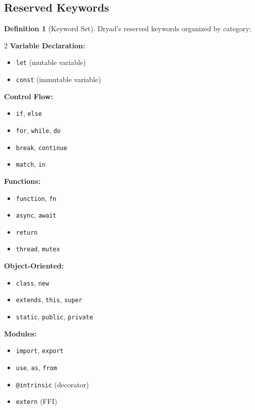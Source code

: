 \documentclass[12pt,a4paper]{article}
\theoremstyle{definition}
\newtheorem{definition}{Definition}[section]
\begin{document}
\subsection{Reserved Keywords}

\begin{definition}[Keyword Set]
Dryad's reserved keywords organized by category:

\begin{multicols}{2}
\textbf{Variable Declaration:}
\begin{itemize}[noitemsep]
    \item \texttt{let} (mutable variable)
    \item \texttt{const} (immutable variable)
\end{itemize}

\textbf{Control Flow:}
\begin{itemize}[noitemsep]
    \item \texttt{if}, \texttt{else}
    \item \texttt{for}, \texttt{while}, \texttt{do}
    \item \texttt{break}, \texttt{continue}
    \item \texttt{match}, \texttt{in}
\end{itemize}

\textbf{Functions:}
\begin{itemize}[noitemsep]
    \item \texttt{function}, \texttt{fn}
    \item \texttt{async}, \texttt{await}
    \item \texttt{return}
    \item \texttt{thread}, \texttt{mutex}
\end{itemize}

\textbf{Object-Oriented:}
\begin{itemize}[noitemsep]
    \item \texttt{class}, \texttt{new}
    \item \texttt{extends}, \texttt{this}, \texttt{super}
    \item \texttt{static}, \texttt{public}, \texttt{private}
\end{itemize}

\textbf{Modules:}
\begin{itemize}[noitemsep]
    \item \texttt{import}, \texttt{export}
    \item \texttt{use}, \texttt{as}, \texttt{from}
    \item \texttt{@intrinsic} (decorator)
    \item \texttt{extern} (FFI)
\end{itemize}


\end{multicols}
\end{definition}
\end{document}
